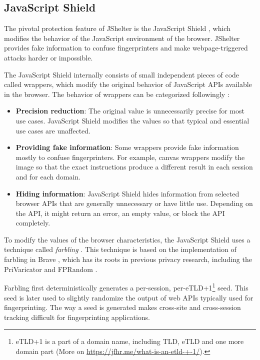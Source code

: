 \subsection{JavaScript Shield}

The pivotal protection feature of JShelter is the JavaScript Shield \cite{JShelterJavaScriptShield}, which modifies the behavior of the JavaScript environment of the browser. JShelter provides fake information to confuse fingerprinters and make webpage-triggered attacks harder or impossible.

The JavaScript Shield internally consists of small independent pieces of code called wrappers, which modify the original behavior of JavaScript APIs available in the browser. The behavior of wrappers can be categorized followingly \cite{JShelterJavaScriptShield}:

\begin{itemize}
	\item \textbf{Precision reduction}: The original value is unnecessarily precise for most use cases. JavaScript Shield modifies the values so that typical and essential use cases are unaffected.
	\item \textbf{Providing fake information}: Some wrappers provide fake information mostly to confuse fingerprinters. For example, canvas wrappers modify the image so that the exact instructions produce a different result in each session and for each domain.
	\item \textbf{Hiding information}: JavaScript Shield hides information from selected browser APIs that are generally unnecessary or have little use. Depending on the API, it might return an error, an empty value, or block the API completely.
\end{itemize}

To modify the values of the browser characteristics, the JavaScript Shield uses a technique called \emph{farbling} \cite{JShelterPaper}. This technique is based on the implementation of farbling in Brave \cite{BraveFingerprintingDefences2}, which has its roots in previous privacy research, including the PriVaricator \cite{PriVaricator} and FPRandom \cite{FPRandom}.

Farbling first deterministically generates a per-session, per-eTLD+1\footnote{eTLD+1 is a part of a domain name, including TLD, eTLD and one more domain part (More on \url{https://jfhr.me/what-is-an-etld-+-1/}).} seed. This seed is later used to slightly randomize the output of web APIs typically used for fingerprinting. The way a seed is generated makes cross-site and cross-session tracking difficult for fingerprinting applications.

